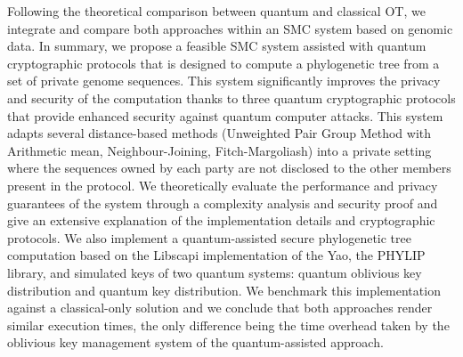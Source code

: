 Following the theoretical comparison between quantum and classical OT, we integrate and compare both approaches within an SMC system based on genomic data. In summary, we propose a feasible SMC system assisted with quantum cryptographic protocols that is designed to compute a phylogenetic tree from a set of private genome sequences. This system significantly improves the privacy and security of the computation thanks to three quantum cryptographic protocols that provide enhanced security against quantum computer attacks. This system adapts several distance-based methods (Unweighted Pair Group Method with Arithmetic mean, Neighbour-Joining, Fitch-Margoliash) into a private setting where the sequences owned by each party are not disclosed to the other members present in the protocol. We theoretically evaluate the performance and privacy guarantees of the system through a complexity analysis and security proof and give an extensive explanation of the implementation details and cryptographic protocols. We also implement a quantum-assisted secure phylogenetic tree computation based on the Libscapi implementation of the Yao, the PHYLIP library, and simulated keys of two quantum systems: quantum oblivious key distribution and quantum key distribution. We benchmark this implementation against a classical-only solution and we conclude that both approaches render similar execution times, the only difference being the time overhead taken by the oblivious key management system of the quantum-assisted approach.

